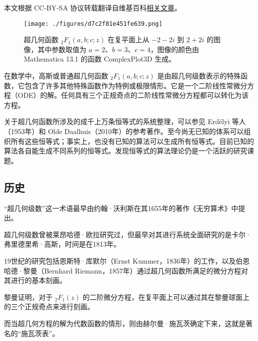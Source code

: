 
本文根据 CC-BY-SA 协议转载翻译自维基百科\href{https://en.wikipedia.org/wiki/Hypergeometric_function}{相关文章}。

\begin{figure}[ht]
\centering
\texttt{[image: ./figures/d7c2f81e451fe639.png]}
\caption{超几何函数 ${}_2F_1(a, b; c; z)$ 在复平面上从 $-2 - 2i$ 到 $2 + 2i$ 的图像，其中参数取值为 $a = 2$、$b = 3$、$c = 4$，图像的颜色由 Mathematica 13.1 的函数 ComplexPlot3D 生成。} \label{fig_CJHhs_1}
\end{figure}
在数学中，高斯或普通超几何函数 ${}_2F_1(a,b;c;z)$ 是由超几何级数表示的特殊函数，它包含了许多其他特殊函数作为特例或极限情形。它是一个二阶线性常微分方程（ODE）的解。任何具有三个正规奇点的二阶线性常微分方程都可以转化为该方程。

关于超几何函数所涉及的成千上万条恒等式的系统整理，可以参见 Erdélyi 等人（1953年）和 Olde Daalhuis（2010年）的参考著作。至今尚无已知的体系可以组织所有这些恒等式；事实上，也没有已知的算法可以生成所有恒等式。目前已知的算法各自能生成不同系列的恒等式。发现恒等式的算法理论仍是一个活跃的研究课题。
\subsection{历史}
“超几何级数”这一术语最早由约翰·沃利斯在其1655年的著作《无穷算术》中提出。

超几何级数曾被莱昂哈德·欧拉研究过，但最早对其进行系统全面研究的是卡尔·弗里德里希·高斯，时间是在1813年。

19世纪的研究包括恩斯特·库默尔（Ernst Kummer，1836年）的工作，以及伯恩哈德·黎曼（Bernhard Riemann，1857年）通过超几何函数所满足的微分方程对其进行的基本刻画。

黎曼证明，对于 ${}_2F_1(z)$ 的二阶微分方程，在复平面上可以通过其在黎曼球面上的三个正规奇点来进行刻画。

而当超几何方程的解为代数函数的情形，则由赫尔曼·施瓦茨确定下来，这就是著名的“施瓦茨表”。
